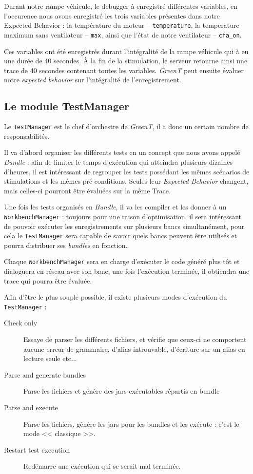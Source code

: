 \begin{exemple}
	Durant notre rampe véhicule, le debugger à enregistré différentes variables, en l'occurence nous avons enregistré les trois variables présentes dans notre Expected Behavior : la température	du moteur -- \texttt{temperature}, la temperature maximum sans ventilateur -- \texttt{max}, ainsi que l'état de notre ventilateur -- \texttt{cfa\_on}.
	
	Ces variables ont été enregistrés durant l'intégralité de la rampe véhicule qui à eu une durée de 40 secondes. À la fin de la stimulation, le serveur retourne ainsi une trace de 40 secondes contenant toutes les variables. \textit{GreenT} peut ensuite évaluer notre \textit{expected behavior} sur l'intégralité de l'enregistrement.
\end{exemple}
\subsection{Le module TestManager}\label{testManager}
Le \texttt{TestManager} est le chef d'orchestre de \textit{GreenT}, il a donc un certain nombre de responsabilités. 

Il va d'abord organiser les différents tests en un concept que nous avons appelé \textit{Bundle} : afin de limiter le temps d'exécution qui atteindra plusieurs dizaines d'heures, il est intéressant de regrouper les tests possédant les mêmes scénarios de stimulations et les mêmes pré conditions. Seules leur \textit{Expected Behavior} changent, mais celles-ci pourront être évaluées sur la même Trace.

Une fois les tests organisés en \textit{Bundle}, il va les compiler et les donner à un \texttt{WorkbenchManager} : toujours pour une
raison d'optimisation, il sera intéressant de pouvoir exécuter les enregistrements sur plusieurs bancs simultanément, pour cela le
\texttt{TestManager} sera capable de savoir quels bancs peuvent être utilisés et pourra distribuer ses \textit{bundles} en fonction. 

Chaque \texttt{WorkbenchManager} sera en charge d'exécuter le code généré plus tôt et dialoguera en réseau avec son banc, une fois l'exécution terminée, il obtiendra une trace qui pourra être évaluée.

Afin d'être le plus souple possible, il existe plusieurs modes d'exécution du \texttt{TestManager} : 
\begin{description}
	\item[Check only] Essaye de parser les différents fichiers, et vérifie que ceux-ci ne comportent aucune erreur de grammaire, d'alias introuvable, d'écriture sur un alias en lecture seule etc...
	\item[Parse and generate bundles] Parse les fichiers et génère des jars exécutables répartis en bundle
	\item[Parse and execute] Parse les fichiers, génère les jars pour les bundles et les exécute : c'est le mode << classique >>.
	\item[Restart test execution] Redémarre une exécution qui se serait mal terminée.
\end{description}

